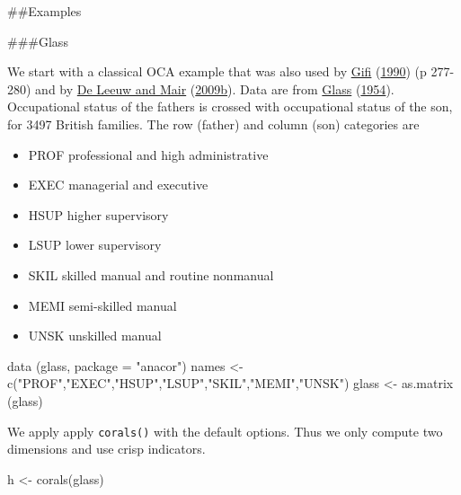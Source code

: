 \documentclass[
  12pt,
]{book}
\newenvironment{Shaded}{\begin{snugshade}}{\end{snugshade}}
\newcommand{\AttributeTok}[1]{\textcolor[rgb]{0.77,0.63,0.00}{#1}}
\newcommand{\FunctionTok}[1]{\textcolor[rgb]{0.00,0.00,0.00}{#1}}
\newcommand{\NormalTok}[1]{#1}
\newcommand{\OtherTok}[1]{\textcolor[rgb]{0.56,0.35,0.01}{#1}}
\newcommand{\StringTok}[1]{\textcolor[rgb]{0.31,0.60,0.02}{#1}}
\providecommand{\tightlist}{%
  \setlength{\itemsep}{0pt}\setlength{\parskip}{0pt}}
\begin{document}
\#\#Examples

\#\#\#Glass

We start with a classical OCA example that was also used by \protect\hyperlink{ref-gifi_B_90}{Gifi} (\protect\hyperlink{ref-gifi_B_90}{1990}) (p 277-280) and by \protect\hyperlink{ref-deleeuw_mair_A_09b}{De Leeuw and Mair} (\protect\hyperlink{ref-deleeuw_mair_A_09b}{2009b}). Data are from \protect\hyperlink{ref-glass_54}{Glass} (\protect\hyperlink{ref-glass_54}{1954}). Occupational status of the fathers is crossed with occupational status of the son, for 3497 British families. The row (father) and column (son) categories are

\begin{itemize}
\tightlist
\item
  PROF professional and high administrative
\item
  EXEC managerial and executive
\item
  HSUP higher supervisory
\item
  LSUP lower supervisory
\item
  SKIL skilled manual and routine nonmanual
\item
  MEMI semi-skilled manual
\item
  UNSK unskilled manual
\end{itemize}

\begin{Shaded}
\begin{Highlighting}[]
\FunctionTok{data}\NormalTok{ (glass, }\AttributeTok{package =} \StringTok{"anacor"}\NormalTok{)}
\NormalTok{names }\OtherTok{\textless{}{-}} \FunctionTok{c}\NormalTok{(}\StringTok{"PROF"}\NormalTok{,}\StringTok{"EXEC"}\NormalTok{,}\StringTok{"HSUP"}\NormalTok{,}\StringTok{"LSUP"}\NormalTok{,}\StringTok{"SKIL"}\NormalTok{,}\StringTok{"MEMI"}\NormalTok{,}\StringTok{"UNSK"}\NormalTok{)}
\NormalTok{glass }\OtherTok{\textless{}{-}} \FunctionTok{as.matrix}\NormalTok{ (glass)}
\end{Highlighting}
\end{Shaded}

We apply apply \texttt{corals()} with the default options. Thus we only compute two dimensions and use crisp indicators.

\begin{Shaded}
\begin{Highlighting}[]
\NormalTok{h }\OtherTok{\textless{}{-}} \FunctionTok{corals}\NormalTok{(glass)}
\end{Highlighting}
\end{Shaded}
\end{document}
